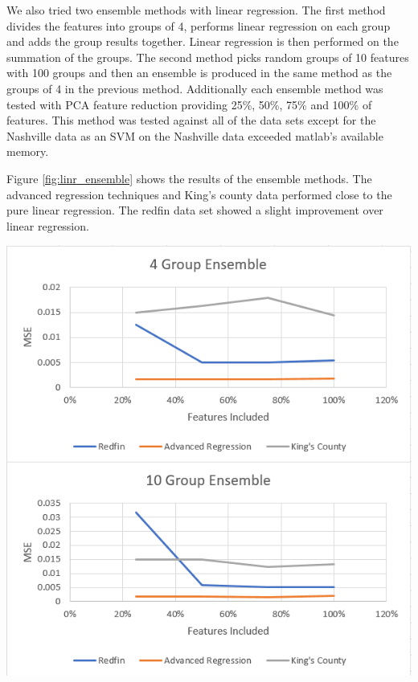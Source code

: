 \documentclass[10pt]{article}
\begin{document}
\begin{multicols}{2}
\begin{tabular}{r|c}
				\hline
			\end{tabular}
			\label{table:linr_performance}        
			\setlength{\parindent}{15pt}
		\par
		We also tried two ensemble methods with linear regression. The first method divides the features into groups of 4, performs linear regression on each group and adds the group results together. Linear regression is then performed on the summation of the groups. The second method picks random groups of 10 features with 100 groups and then an ensemble is produced in the same method as the groups of 4 in the previous method. Additionally each ensemble method was tested with PCA feature reduction providing 25\%, 50\%, 75\% and 100\% of features. This method was tested against all of the data sets except for the Nashville data as an SVM on the Nashville data exceeded matlab's available memory.
                \par
                Figure \ref{fig:linr_ensemble} shows the results of the ensemble methods. The advanced regression techniques and King's county data performed close to the pure linear regression. The redfin data set showed a slight improvement over linear regression.
		\begin{center}
                  \captionsetup{type=figure}
			\includegraphics[scale=0.35]{Images/LineEnsembleResults} \\
			\label{fig:linr_ensemble}
		\end{center}
		\par

\end{multicols}
\end{document}
